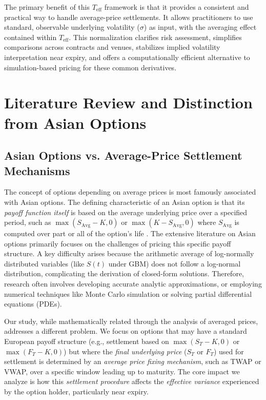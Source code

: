 \documentclass[11pt]{article}
\theoremstyle{plain}
\begin{document}
The primary benefit of this $T_{\mathrm{eff}}$ framework is that it provides a consistent and practical way to handle average-price settlements. It allows practitioners to use standard, observable underlying volatility ($\sigma$) as input, with the averaging effect contained within $T_{\mathrm{eff}}$. This normalization clarifies risk assessment, simplifies comparisons across contracts and venues, stabilizes implied volatility interpretation near expiry, and offers a computationally efficient alternative to simulation-based pricing for these common derivatives.

\section{Literature Review and Distinction from Asian Options}
\label{sec:literature}

\subsection{Asian Options vs. Average-Price Settlement Mechanisms}
The concept of options depending on average prices is most famously associated with Asian options. The defining characteristic of an Asian option is that its \textit{payoff function itself} is based on the average underlying price over a specified period, such as $\max(S_{\mathrm{Avg}} - K, 0)$ or $\max(K - S_{\mathrm{Avg}}, 0)$ where $S_{\mathrm{Avg}}$ is computed over part or all of the option's life \citep{kemna1990pricing, hull2006options}. The extensive literature on Asian options primarily focuses on the challenges of pricing this specific payoff structure. A key difficulty arises because the arithmetic average of log-normally distributed variables (like $S(t)$ under GBM) does not follow a log-normal distribution, complicating the derivation of closed-form solutions. Therefore, research often involves developing accurate analytic approximations, or employing numerical techniques like Monte Carlo simulation or solving partial differential equations (PDEs).

Our study, while mathematically related through the analysis of averaged prices, addresses a different problem. We focus on options that may have a standard European payoff structure (e.g., settlement based on $\max(S_T - K, 0)$ or $\max(F_T - K, 0)$) but where the \textit{final underlying price} ($S_T$ or $F_T$) used for settlement is determined by an \textit{average price fixing mechanism}, such as TWAP or VWAP, over a specific window leading up to maturity. The core impact we analyze is how this \textit{settlement procedure} affects the \textit{effective variance} experienced by the option holder, particularly near expiry.
\end{document}
